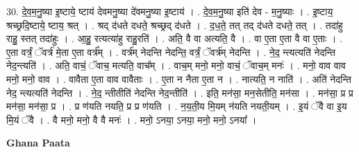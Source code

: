 \documentclass[17pt]{extarticle}
\begin{document}
30. दे॒व॒म॒नु॒ष्या इ॒ष्टाये॒ ष्टाय॑ देवमनु॒ष्या दे॑वमनु॒ष्या इ॒ष्टाय॑ । . दे॒व॒म॒नु॒ष्या इति॑ देव - म॒नु॒ष्याः । . इ॒ष्टाय॒ श्रच्छ्रदि॒ष्टाये॒ ष्टाय॒ श्रत् । . श्रद् द॑धते दधते॒ श्रच्छ्रद् द॑धते । . द॒ध॒ते॒ तत् तद् द॑धते दधते॒ तत् । . तदा॑हु राहु॒ स्तत् तदा॑हुः । . आ॒हु॒ रत्यत्या॑हु राहु॒रति॑ । . अति॒ वै वा अत्यति॒ वै । . वा ए॒ता ए॒ता वै वा ए॒ताः । . ए॒ता वर्त्रं॒ ॅवर्त्र॑ मे॒ता ए॒ता वर्त्र᳚म् । . वर्त्र॑म् नेदन्ति नेदन्ति॒ वर्त्रं॒ ॅवर्त्र॑म् नेदन्ति । . ने॒द॒ न्त्यत्यति॑ नेदन्ति नेद॒न्त्यति॑ । . अति॒ वाचं॒ ॅवाच॒ मत्यति॒ वाच᳚म् । . वाच॒म् मनो॒ मनो॒ वाचं॒ ॅवाच॒म् मनः॑ । . मनो॒ वाव वाव मनो॒ मनो॒ वाव । . वावैता ए॒ता वाव वावैताः । . ए॒ता न नैता ए॒ता न । . नात्यति॒ न नाति॑ । . अति॑ नेदन्ति नेद॒ न्त्यत्यति॑ नेदन्ति । . ने॒द॒ न्तीतीति॑ नेदन्ति नेद॒न्तीति॑ । . इति॒ मन॑सा॒ मन॒सेतीति॒ मन॑सा । . मन॑सा॒ प्र प्र मन॑सा॒ मन॑सा॒ प्र । . प्र ण॑यति नयति॒ प्र प्र ण॑यति । . न॒य॒ती॒य मि॒यम् न॑यति नयती॒यम् । . इ॒यं ॅवै वा इ॒य मि॒यं ॅवै । . वै मनो॒ मनो॒ वै वै मनः॑ । . मनो॒ ऽनया॒ ऽनया॒ मनो॒ मनो॒ ऽनया᳚ । \newline

\textbf{Ghana Paata } \newline
\end{document}
